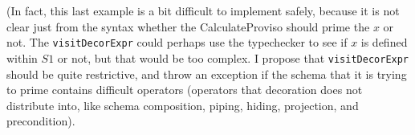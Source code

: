 \documentclass{article}
\begin{document}
(In fact, this last example is a bit difficult to implement safely,
because it is not clear just from the syntax whether the CalculateProviso
should prime the $x$ or not.  The \verb!visitDecorExpr! could perhaps
use the typechecker to see if $x$ is defined within $S1$ or not, but
that would be too complex.  I propose that \verb!visitDecorExpr! should
be quite restrictive, and throw an exception if the schema that it
is trying to prime contains difficult operators (operators that
decoration does not distribute into, like schema composition,
piping, hiding, projection, and precondition).
\end{document}
